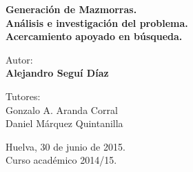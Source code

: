 {\begin{center}
{\LARGE \bf Generación de Mazmorras. \\ Análisis e investigación del problema. \\ Acercamiento apoyado en búsqueda. }

\end{center} 




\vspace*{0.5cm}

\begin{center}
{\normalsize Autor: \\ {\bf Alejandro Seguí Díaz}}
\end{center}

\begin{center}
{\small Tutores: }
\vspace*{0.2cm}
{\small \\  Gonzalo A. Aranda Corral \\ Daniel Márquez Quintanilla}
\end{center}

\vspace*{0.5cm}
\vfill
\begin{center}
{\footnotesize Huelva, 30 de junio de 2015.\\Curso académico 2014/15.}
\end{center}





\newpage
\thispagestyle{empty}
\mbox{ }
\newpage
\thispagestyle{empty}

\newpage
\thispagestyle{empty}

\mbox{ }

\vfill

\begin{flushright}
  \begin{minipage}{9cm}

\end{minipage}
\end{flushright}

\vfill

\newpage
\thispagestyle{empty}
\mbox{ }

}

